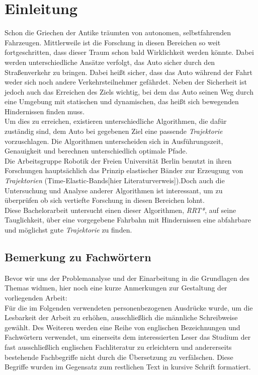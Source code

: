\section{Einleitung}
Schon die Griechen der Antike träumten von autonomen, selbstfahrenden Fahrzeugen. Mittlerweile ist die Forschung in diesen Bereichen so weit fortgeschritten, dass dieser Traum schon bald Wirklichkeit werden könnte. Dabei werden unterschiedliche Ansätze verfolgt, das Auto sicher durch den Straßenverkehr zu bringen. Dabei heißt sicher, dass das Auto während der Fahrt weder sich noch andere Verkehrsteilnehmer gefährdet. Neben der Sicherheit ist jedoch auch das Erreichen des Ziels wichtig, bei dem das Auto seinen Weg durch eine Umgebung mit statischen und dynamischen, das heißt sich bewegenden Hindernissen finden muss. \\
Um dies zu erreichen, existieren unterschiedliche Algorithmen, die dafür zuständig sind, dem Auto bei gegebenen Ziel eine passende \textit{Trajektorie} vorzuschlagen. Die Algorithmen unterscheiden sich in Ausführungszeit, Genauigkeit und berechnen unterschiedlich optimale Pfade.  \\
Die Arbeitsgruppe Robotik der Freien Universität Berlin benutzt in ihren Forschungen hauptsächlich das Prinzip elastischer Bänder zur Erzeugung von \textit{Trajektorien} (Time-Elastic-Bands[hier Literaturverweis]).Doch auch die Untersuchung und Analyse anderer Algorithmen ist interessant, um zu überprüfen ob sich vertiefte Forschung in diesen Bereichen lohnt. \\
Diese Bachelorarbeit untersucht einen dieser Algorithmen, \textit{RRT*}, auf seine Tauglichkeit, über eine vorgegebene Fahrbahn mit Hindernissen eine abfahrbare und möglichst gute \textit{Trajektorie} zu finden.

\subsection{Bemerkung zu Fachwörtern}
Bevor wir uns der Problemanalyse und der Einarbeitung in die Grundlagen des Themas  widmen, hier noch eine kurze Anmerkungen zur Gestaltung der
vorliegenden Arbeit: \\
Für die im Folgenden verwendeten personenbezogenen
Ausdrücke wurde, um die Lesbarkeit der Arbeit zu erhöhen,
ausschließlich die männliche Schreibweise gewählt. Des Weiteren werden eine
Reihe von englischen Bezeichnungen und Fachwörtern verwendet, um einerseits dem
interessierten Leser das Studium der fast ausschließlich englischen
Fachliteratur zu erleichtern und andererseits bestehende Fachbegriffe nicht durch die Übersetzung zu verfälschen. Diese Begriffe
wurden im Gegensatz zum restlichen Text in kursive Schrift formatiert.
